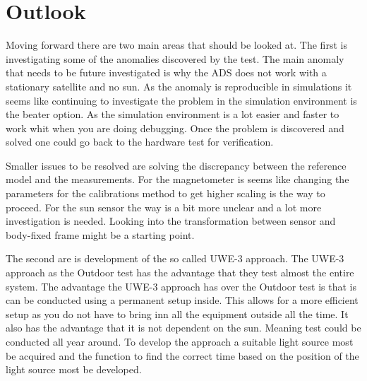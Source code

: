 \chapter{Outlook}
\label{sec-outlook}
Moving forward there are two main areas that should be looked at. The first is investigating some of the anomalies discovered by the test. The main anomaly that needs to be future investigated is why the ADS does not work with a stationary satellite and no sun. As the anomaly is reproducible in simulations it seems like continuing to investigate the problem in the simulation environment is the beater option. As the simulation environment is a lot easier and faster to work whit when you are doing debugging. Once the problem is discovered and solved one could go back to the hardware test for verification. 

Smaller issues to be resolved are solving the discrepancy between the reference model and the measurements. For the magnetometer is seems like changing the parameters for the calibrations method to get higher scaling is the way to proceed. For the sun sensor the way is a bit more unclear and a lot more investigation is needed. Looking into the transformation between sensor and body-fixed frame might be a starting point. 

The second are is development of the so called UWE-3 approach. The UWE-3 approach as the Outdoor test has the advantage that they test almost the entire system. The advantage the UWE-3 approach has over the Outdoor test is that is can be conducted using a permanent setup inside. This allows for a more efficient setup as you do not have to bring inn all the equipment outside all the time. It also has the advantage that it is not dependent on the sun. Meaning test could be conducted all year around. To develop the approach a suitable light source most be acquired and the function to find the correct time based on the position of the light source most be developed.                     